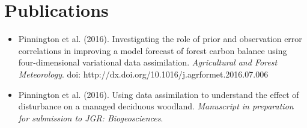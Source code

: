 \documentclass[11pt]{article}
\begin{document}
\section*{Publications}
\begin{itemize}
\item Pinnington et al. (2016). Investigating the role of prior and observation error correlations in improving a model
forecast of forest carbon balance using four-dimensional variational data assimilation. \textit{Agricultural and
Forest Meteorology}. doi: http://dx.doi.org/10.1016/j.agrformet.2016.07.006

\item Pinnington et al. (2016). Using data assimilation to understand the effect of disturbance on a managed deciduous woodland. \textit{Manuscript in preparation for submission to JGR: Biogeosciences}. 
\end{itemize}
\end{document}
